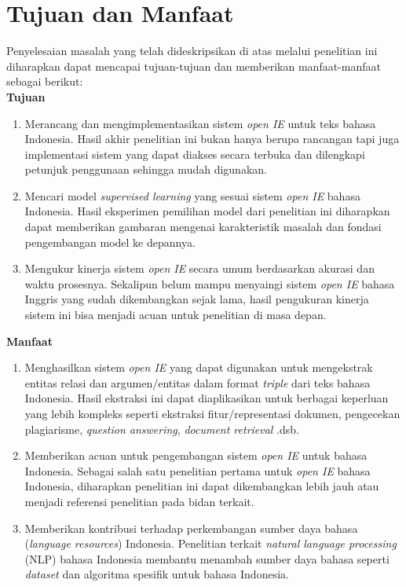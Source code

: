 \section{Tujuan dan Manfaat}

Penyelesaian masalah yang telah dideskripsikan di atas melalui penelitian ini diharapkan dapat mencapai tujuan-tujuan dan memberikan manfaat-manfaat sebagai berikut:\\

\textbf{Tujuan}

\begin{enumerate}
	\item Merancang dan mengimplementasikan sistem \textit{open IE} untuk teks bahasa Indonesia. Hasil akhir penelitian ini bukan hanya berupa rancangan tapi juga implementasi sistem yang dapat diakses secara terbuka dan dilengkapi petunjuk penggunaan sehingga mudah digunakan.
	
	\item Mencari model \textit{supervised learning} yang sesuai sistem \textit{open IE} bahasa Indonesia. Hasil eksperimen pemilihan model dari penelitian ini diharapkan dapat memberikan gambaran mengenai karakteristik masalah dan fondasi pengembangan model ke depannya.
	
	\item Mengukur kinerja sistem \textit{open IE} secara umum berdasarkan akurasi dan waktu prosesnya. Sekalipun belum mampu menyaingi sistem \textit{open IE} bahasa Inggris yang sudah dikembangkan sejak lama, hasil pengukuran kinerja sistem ini bisa menjadi acuan untuk penelitian di masa depan.
\end{enumerate}

\textbf{Manfaat}

\begin{enumerate}
	\item Menghasilkan sistem \textit{open IE} yang dapat digunakan untuk mengekstrak entitas relasi dan argumen/entitas dalam format \textit{triple} dari teks bahasa Indonesia. Hasil ekstraksi ini dapat diaplikasikan untuk berbagai keperluan yang lebih kompleks seperti ekstraksi fitur/representasi dokumen, pengecekan plagiarisme, \textit{question answering}, \textit{document retrieval} .dsb.
	
	\item Memberikan acuan untuk pengembangan sistem \textit{open IE} untuk bahasa Indonesia. Sebagai salah satu penelitian pertama untuk \textit{open IE} bahasa Indonesia, diharapkan penelitian ini dapat dikembangkan lebih jauh atau menjadi referensi penelitian pada bidan terkait.
	
	\item Memberikan kontribusi terhadap perkembangan sumber daya bahasa (\textit{language resources}) Indonesia. Penelitian terkait \textit{natural language processing} (NLP) bahasa Indonesia membantu menambah sumber daya bahasa seperti \textit{dataset} dan algoritma spesifik untuk bahasa Indonesia.
\end{enumerate}

